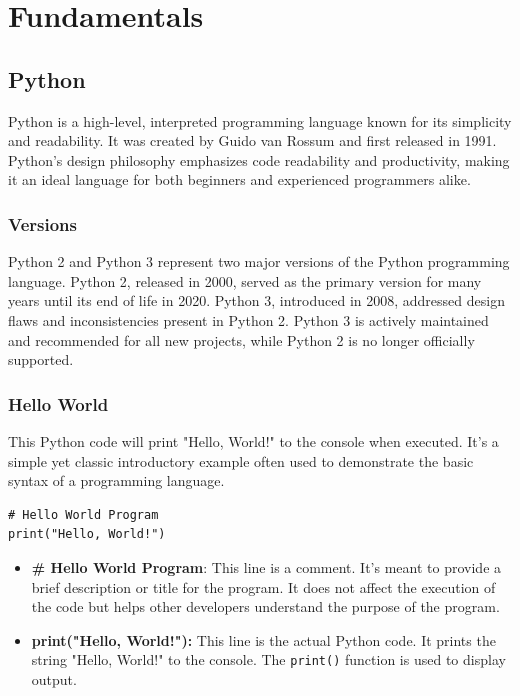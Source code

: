 \section{Fundamentals}

\subsection{Python}
Python is a high-level, interpreted programming language known for its simplicity and readability. It was created by Guido van Rossum and first released in 1991. Python's design philosophy emphasizes code readability and productivity, making it an ideal language for both beginners and experienced programmers alike.

\subsubsection{Versions}
Python 2 and Python 3 represent two major versions of the Python programming language. Python 2, released in 2000, served as the primary version for many years until its end of life in 2020. Python 3, introduced in 2008, addressed design flaws and inconsistencies present in Python 2. Python 3 is actively maintained and recommended for all new projects, while Python 2 is no longer officially supported.

\subsubsection{Hello World}
This Python code will print "Hello, World!" to the console when executed. It's a simple yet classic introductory example often used to demonstrate the basic syntax of a programming language.

\begin{codebox}
\begin{verbatim}
# Hello World Program
print("Hello, World!")
\end{verbatim}
\end{codebox}

\begin{itemize}
    \item \textbf{\# Hello World Program}: This line is a comment. It's meant to provide a brief description or title for the program. It does not affect the execution of the code but helps other developers understand the purpose of the program.
    \item \textbf{print("Hello, World!"):} This line is the actual Python code. It prints the string "Hello, World!" to the console. The \texttt{print()} function is used to display output.
\end{itemize}

